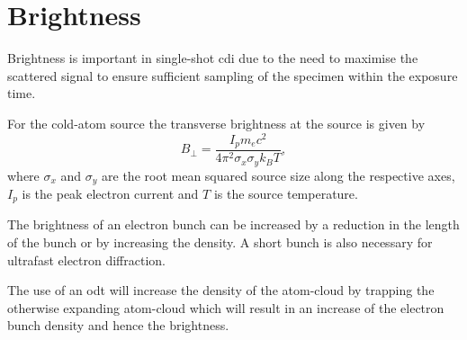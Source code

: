 \section{Brightness}
Brightness is important in single-shot \gls{cdi} due to the need to maximise the scattered signal to ensure sufficient sampling of the specimen within the exposure time.

For the cold-atom source the transverse brightness at the source is given by\cite{reiser_theory_2008}
\begin{equation}
B_\perp = \frac{I_p m_e c^2}{4 \pi^2 \sigma_x \sigma_y k_B T},
\end{equation}
where $\sigma_x$ and $\sigma_y$ are the root mean squared source size along the respective axes, $I_p$ is the peak electron current and $T$ is the source temperature.

The brightness of an electron bunch can be increased by a reduction in the length of the bunch or by increasing the density. A short bunch is also necessary for ultrafast electron diffraction.

The use of an \gls{odt} will increase the density of the atom-cloud by trapping the otherwise expanding atom-cloud which will result in an increase of the electron bunch density and hence the brightness.
